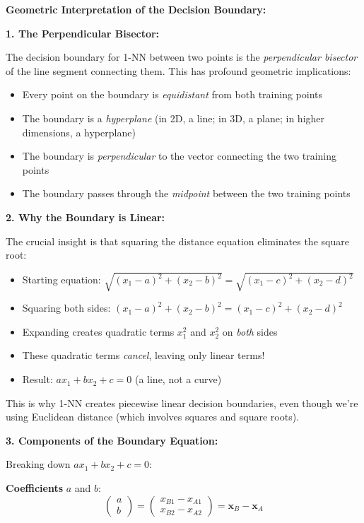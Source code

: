 \documentclass[12pt]{article}
\begin{document}
\begin{explanation}
\textbf{Geometric Interpretation of the Decision Boundary:}

\textbf{1. The Perpendicular Bisector:}

The decision boundary for 1-NN between two points is the \textit{perpendicular bisector} of the line segment connecting them. This has profound geometric implications:

\begin{itemize}
    \item Every point on the boundary is \textit{equidistant} from both training points
    \item The boundary is a \textit{hyperplane} (in 2D, a line; in 3D, a plane; in higher dimensions, a hyperplane)
    \item The boundary is \textit{perpendicular} to the vector connecting the two training points
    \item The boundary passes through the \textit{midpoint} between the two training points
\end{itemize}

\textbf{2. Why the Boundary is Linear:}

The crucial insight is that squaring the distance equation eliminates the square root:
\begin{itemize}
    \item Starting equation: \(\sqrt{(x_1 - a)^2 + (x_2 - b)^2} = \sqrt{(x_1 - c)^2 + (x_2 - d)^2}\)
    \item Squaring both sides: \((x_1 - a)^2 + (x_2 - b)^2 = (x_1 - c)^2 + (x_2 - d)^2\)
    \item Expanding creates quadratic terms \(x_1^2\) and \(x_2^2\) on \textit{both} sides
    \item These quadratic terms \textit{cancel}, leaving only linear terms!
    \item Result: \(ax_1 + bx_2 + c = 0\) (a line, not a curve)
\end{itemize}

This is why 1-NN creates piecewise linear decision boundaries, even though we're using Euclidean distance (which involves squares and square roots).

\textbf{3. Components of the Boundary Equation:}

Breaking down \(ax_1 + bx_2 + c = 0\):

\textbf{Coefficients } \(a\) and \(b\):
\[
\begin{pmatrix} a \\ b \end{pmatrix} = \begin{pmatrix} x_{B1} - x_{A1} \\ x_{B2} - x_{A2} \end{pmatrix} = \mathbf{x}_B - \mathbf{x}_A
\]


\end{explanation}
\end{document}
